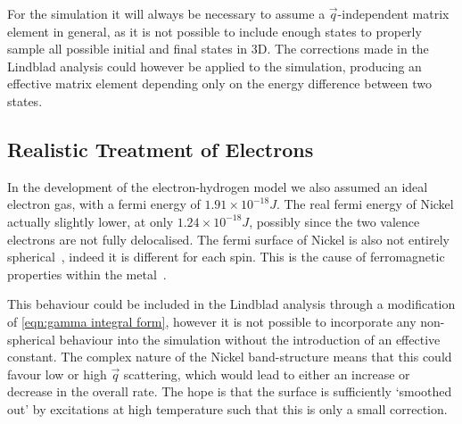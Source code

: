 For the  simulation
it will always
be necessary to assume a
\(\vec{q}\)-independent
matrix element in general,
as it is not possible
to include enough
states to properly
sample all possible initial
and final
states in 3D.
The corrections made in
the Lindblad analysis could
however be applied to the simulation,
producing an effective matrix
element depending only
on the energy difference between
two states.


\subsection{Realistic Treatment of Electrons}
In the development
of the electron-hydrogen
model we also assumed
an ideal electron gas,
with a fermi energy
of \(1.91\times{}10^{-18}J\).
The real fermi energy
of Nickel actually slightly lower,
at only \(1.24\times{} 10^{-18}J\),
possibly since the two
valence electrons are not
fully delocalised.
The fermi surface of Nickel
is also not entirely
spherical~\cite{FermiSufaceNickel},
indeed it is different
for each spin.
This is the cause of
ferromagnetic properties
within the metal~\cite{PhysRev.49.537}.

This behaviour could
be included in the
Lindblad analysis through
a modification of \cref{eqn:gamma integral form},
however it is not possible
to incorporate any
non-spherical behaviour
into the simulation
without the introduction of
an effective constant.
The complex nature of
the Nickel band-structure
means that this
could favour low or
high \(\vec{q}\) scattering,
which would lead to either an increase
or decrease in the
overall rate.
The hope
is that the surface
is sufficiently
`smoothed out' by
excitations at high
temperature such that
this is only a small
correction.